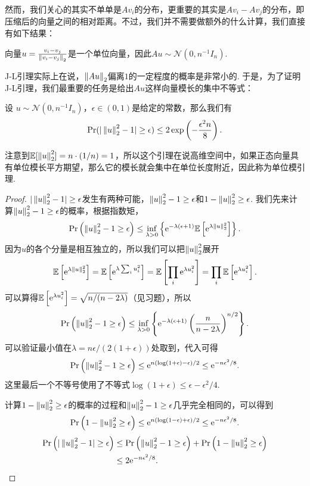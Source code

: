 然而，我们关心的其实不单单是$Av_i$的分布，更重要的其实是$Av_i-Av_j$的分布，即压缩后的向量之间的相对距离。不过，我们并不需要做额外的什么计算，我们直接有如下结果：

\begin{lemma}\label{lemma:gaussian-vector-diff}
    向量$u=\frac{v_i-v_j}{\left\|v_i-v_j\right\|_2}$是一个单位向量，因此$Au\sim \mathcal N(0,n^{-1}I_n)$.
\end{lemma}

J-L引理实际上在说，$\left\|Au\right\|_2$偏离$1$的一定程度的概率是非常小的. 于是，为了证明J-L引理，我们最重要的任务是给出$Au$这样向量模长的集中不等式：
\begin{lemma}[单位模引理]\label{lemma:unit-mod-lemma}
    设 $u\sim \mathcal N(0,n^{-1}I_n)$，$\epsilon \in (0,1 )$是给定的常数，那么我们有
    \[
        \Pr(|\left\|u\right\|_2^2 - 1| \geq \epsilon) \leq 2\exp \left(-\frac{\epsilon^2 n}{8}\right).
    \]
\end{lemma}
注意到$\mathbb{E}[\left\|u\right\|_2^2]=n\cdot(1/n)=1$，所以这个引理在说高维空间中，如果正态向量具有单位模长平方期望，那么它的模长就会集中在单位长度附近，因此称为单位模引理.

\begin{proof}
$|\left\|u\right\|_2^2 - 1| \geq \epsilon$发生有两种可能，$ \left\|u\right\|_2^2 - 1 \geq \epsilon$和$ 1 - \left\|u\right\|_2^2 \geq \epsilon$. 我们先来计算$ \left\|u\right\|_2^2 - 1 \geq \epsilon$的概率，根据指数矩，
    \[
    \Pr\left(\left\|u\right\|_2^2 - 1 \geq \epsilon\right) \leq \inf_{\lambda > 0} \left\{\mathrm{e}^{- \lambda (\epsilon + 1)} \mathbb{E} \left[\mathrm{e}^{\lambda \left\|u\right\|_2^2}\right]\right\}. 
    \]
因为$u$的各个分量是相互独立的，所以我们可以把$\left\|u\right\|_2^2$展开
    \[
    \mathbb{E}\left[\mathrm{e}^{\lambda \left\|u\right\|_2^2}\right] = \mathbb{E}\left[\mathrm{e}^{\lambda \sum_i u_i^2}\right] = \mathbb{E}\left[\prod_i \mathrm{e}^{\lambda u_i^2}\right] = \prod_i \mathbb{E}\left[\mathrm{e}^{\lambda u_i^2}\right]. 
    \]
可以算得$\mathbb{E}\left[\mathrm{e}^{\lambda u_i^2}\right]= \sqrt{n/(n-2\lambda)}$（见习题），所以
    \[
    \Pr\left(\left\|u\right\|_2^2 - 1 \geq \epsilon\right) \leq \inf_{\lambda > 0} \left\{\mathrm{e}^{- \lambda (\epsilon + 1)} \left(\frac{n}{n-2\lambda} \right)^{n/2}\right\}. 
    \]
可以验证最小值在$\lambda = n\epsilon/(2(1+\epsilon))$处取到，代入可得
    \[
    \Pr\left(\left\|u\right\|_2^2 - 1 \geq \epsilon\right) \leq \mathrm{e}^{n(\log (1+\epsilon) - \epsilon)/2} \leq \mathrm{e}^{-n\epsilon^2/8}. 
    \]
这里最后一个不等号使用了不等式$\log(1+\epsilon)\leq\epsilon-\epsilon^2/4$. 

计算$1 - \left\|u\right\|_2^2 \geq \epsilon$的概率的过程和$\left\|u\right\|_2^2 - 1 \geq \epsilon$几乎完全相同的，可以得到
    \[
    \Pr\left(1 - \left\|u\right\|_2^2 \geq \epsilon\right) \leq \mathrm{e}^{n(\log (1-\epsilon) + \epsilon)/2} \leq \mathrm{e}^{-n\epsilon^2/8}. 
    \]
    \begin{align*}
        \Pr\left(| \left\|u\right\|_2^2 - 1| \geq \epsilon\right) &\leq \Pr\left(\left\|u\right\|_2^2 - 1 \geq \epsilon\right) + \Pr\left(1 - \left\|u\right\|_2^2 \geq \epsilon\right) \\
        &\leq 2\mathrm{e}^{-n\epsilon^2/8}. 
    \end{align*}
\end{proof}

